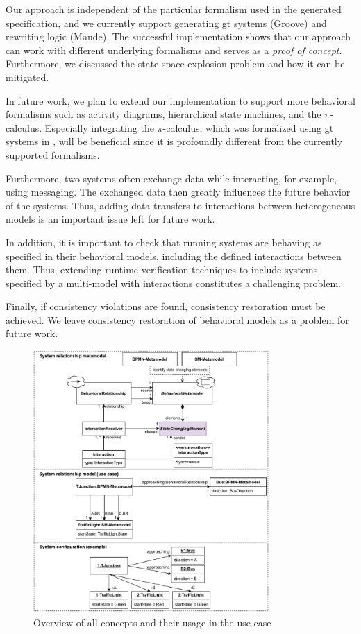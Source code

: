 \documentclass{jot}
\begin{document}
Our approach is independent of the particular formalism used in the generated specification, and we currently support generating \gls*{gt} systems (Groove) and rewriting logic (Maude).
The successful implementation shows that our approach can work with different underlying formalisms and serves as a \emph{proof of concept}.
Furthermore, we discussed the state space explosion problem and how it can be mitigated.

In future work, we plan to extend our implementation to support more behavioral formalisms such as activity diagrams, hierarchical state machines, and the $\pi$-calculus.
Especially integrating the $\pi$-calculus, which was formalized using \gls*{gt} systems in \cite{gadducciGraphRewritingPcalculus2007}, will be beneficial since it is profoundly different from the currently supported formalisms.

Furthermore, two systems often exchange data while interacting, for example, using messaging.
The exchanged data then greatly influences the future behavior of the systems.
Thus, adding data transfers to interactions between heterogeneous models is an important issue left for future work.

In addition, it is important to check that running systems are behaving as specified in their behavioral models, including the defined interactions between them.
Thus, extending runtime verification techniques to include systems specified by a multi-model with interactions constitutes a challenging problem.

Finally, if consistency violations are found, consistency restoration must be achieved.
We leave consistency restoration of behavioral models as a problem for future work.



\begin{figure}[ht!]
    \centering
    \includegraphics[width=0.8\textwidth]{figures/allConcepts.pdf}
    \caption{Overview of all concepts and their usage in the use case}
    \label{fig:allConcepts}
\end{figure}
\end{document}
